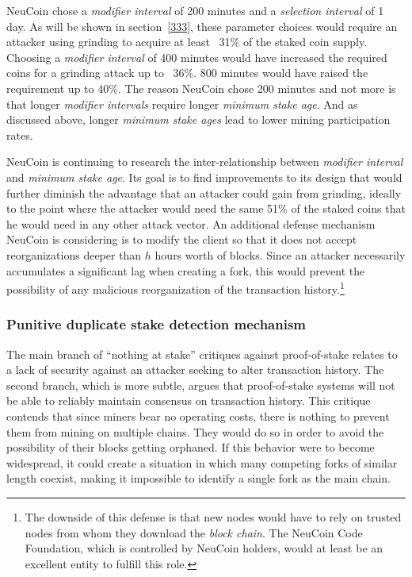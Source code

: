 \documentclass[a4paper,11pt]{article}
\begin{document}
NeuCoin chose a \textit{modifier interval} of 200 minutes and a \textit{selection interval} of 1 day. As will be shown in section~\ref{333}, these parameter choices would require an attacker using grinding to acquire at least ~31\% of the staked coin supply. Choosing a \textit{modifier interval} of 400 minutes would have increased the required coins for a grinding attack up to ~36\%. 800 minutes would have raised the requirement up to 40\%. The reason NeuCoin chose 200 minutes and not more is that longer \textit{modifier intervals} require longer \textit{minimum stake age}. And as discussed above, longer \textit{minimum stake ages} lead to lower mining participation rates.

NeuCoin is continuing to research the inter-relationship between \textit{modifier interval} and \textit{minimum stake age}. Its goal is to find improvements to its design that would further diminish the advantage that an attacker could gain from grinding, ideally to the point where the attacker would need the same 51\% of the staked coins that he would need in any other attack vector. An additional defense mechanism NeuCoin is considering is to modify the client so that it does not accept reorganizations deeper than $h$ hours worth of blocks. Since an attacker necessarily accumulates a significant lag when creating a fork, this would prevent the possibility of any malicious reorganization of the transaction history.\footnote{The downside of this defense is that new nodes would have to rely on trusted nodes from whom they download the \textit{block chain}. The NeuCoin Code Foundation, which is controlled by NeuCoin holders, would at least be an excellent entity to fulfill this role.}


\subsubsection*{Punitive duplicate stake detection mechanism}

The main branch of ``nothing at stake'' critiques against proof-of-stake relates to a lack of security against an attacker seeking to alter transaction history. The second branch, which is more subtle, argues that proof-of-stake systems will not be able to reliably maintain consensus on transaction history. This critique contends that since miners bear no operating costs, there is nothing to prevent them from mining on multiple chains. They would do so in order to avoid the possibility of their blocks getting orphaned. If this behavior were to become widespread, it could create a situation in which many competing forks of similar length coexist, making it impossible to identify a single fork as the main chain. 
\end{document}
